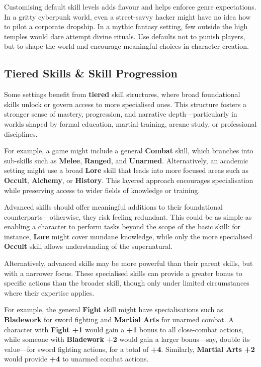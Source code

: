 Customising default skill levels adds flavour and helps enforce genre expectations. In a gritty cyberpunk world, even a street-savvy hacker might have no idea how to pilot a corporate dropship. In a mythic fantasy setting, few outside the high temples would dare attempt divine rituals. Use defaults not to punish players, but to shape the world and encourage meaningful choices in character creation.

\subsection{Tiered Skills \& Skill Progression}\label{toolbox:skill-progress}

Some settings benefit from \textbf{tiered} skill structures, where broad foundational skills unlock or govern access to more specialised ones. This structure fosters a stronger sense of mastery, progression, and narrative depth—particularly in worlds shaped by formal education, martial training, arcane study, or professional disciplines.

For example, a game might include a general \textbf{Combat} skill, which branches into sub-skills such as \textbf{Melee}, \textbf{Ranged}, and \textbf{Unarmed}. Alternatively, an academic setting might use a broad \textbf{Lore} skill that leads into more focused areas such as \textbf{Occult}, \textbf{Alchemy}, or \textbf{History}. This layered approach encourages specialisation while preserving access to wider fields of knowledge or training.

Advanced skills should offer meaningful additions to their foundational counterparts—otherwise, they risk feeling redundant. This could be as simple as enabling a character to perform tasks beyond the scope of the basic skill: for instance, \textbf{Lore} might cover mundane knowledge, while only the more specialised \textbf{Occult} skill allows understanding of the supernatural.

Alternatively, advanced skills may be more powerful than their parent skills, but with a narrower focus. These specialised skills can provide a greater bonus to specific actions than the broader skill, though only under limited circumstances where their expertise applies.

For example, the general \textbf{Fight} skill might have specialisations such as \textbf{Bladework} for sword fighting and \textbf{Martial Arts} for unarmed combat. A character with \textbf{Fight +1} would gain a \textbf{+1} bonus to all close-combat actions, while someone with \textbf{Bladework +2} would gain a larger bonus—say, double its value—for sword fighting actions, for a total of \textbf{+4}. Similarly, \textbf{Martial Arts +2} would provide \textbf{+4} to unarmed combat actions.

